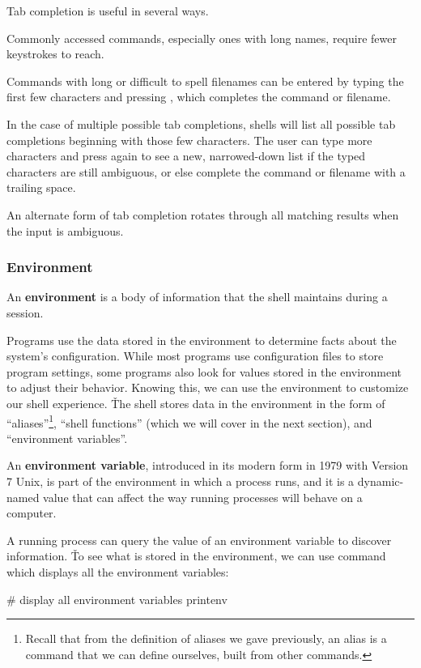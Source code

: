 Tab completion is useful in several ways.
\bit
\item Commonly accessed commands, especially ones with long names, require fewer keystrokes to reach.
\item Commands with long or difficult to spell filenames can be entered by typing the first few characters and pressing
, which completes the command or filename.
\item In the case of multiple possible tab completions, shells will list all possible tab completions beginning with
those few characters. The user can type more characters and press  again to see a new, narrowed-down list if
the typed characters are still ambiguous, or else complete the command or filename with a trailing space.
\item An alternate form of tab completion rotates through all matching results when the input is ambiguous.
\eit

\subsubsection{Environment}

\bd[Environment]
An \textbf{environment} is a body of information that the shell maintains during a session.
\ed

Programs use the data stored in the environment to determine facts about the system's configuration. While most
programs use configuration files to store program settings, some programs also look for values stored in the
environment to adjust their behavior. Knowing this, we can use the environment to customize our shell experience. \v

The shell stores data in the environment in the form of ``aliases''\footnote{Recall that from the definition of
aliases we gave previously, an alias is a command that we can define ourselves, built from other commands.}, ``shell
functions'' (which we will cover in the next section), and ``environment variables''.

An \textbf{environment variable}, introduced in its modern form in 1979 with Version 7 Unix, is part of the environment
in which a process runs, and it is a dynamic-named value that can affect the way running processes will behave on a
computer.
\ed

A running process can query the value of an environment variable to discover information. \v

To see what is stored in the environment, we can use  command which displays all the environment
variables:
\begin{bash}
# display all environment variables
printenv
\end{bash}

